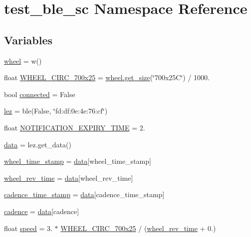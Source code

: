 \hypertarget{namespacetest__ble__sc}{}\section{test\+\_\+ble\+\_\+sc Namespace Reference}
\label{namespacetest__ble__sc}
\subsection*{Variables}
\begin{DoxyCompactItemize}
\item 
\hyperlink{namespacetest__ble__sc_a20264d27cfbcb7de858b1ca0e17e5e3b}{wheel} = w()
\item 
float \hyperlink{namespacetest__ble__sc_ab00679d6ecee9efe37b2803c4013de50}{W\+H\+E\+E\+L\+\_\+\+C\+I\+R\+C\+\_\+700x25} = \hyperlink{classwheel_1_1wheel_a2c8cb4fefde6714812f8d362b8744a63}{wheel.\+get\+\_\+size}(\char`\"{}700x25\+C\char`\"{}) / 1000.
\item 
bool \hyperlink{namespacetest__ble__sc_a93e07d8d1a8b72222e29c51ed19c31c6}{connected} = False
\item 
\hyperlink{namespacetest__ble__sc_a5821fe04e2db9045cfc972f8857dd3ed}{lez} = ble(False, \char`\"{}fd\+:df\+:0e\+:4e\+:76\+:cf\char`\"{})
\item 
float \hyperlink{namespacetest__ble__sc_a2ca65f5ebbcf2906c4f2c7f64eca7622}{N\+O\+T\+I\+F\+I\+C\+A\+T\+I\+O\+N\+\_\+\+E\+X\+P\+I\+R\+Y\+\_\+\+T\+I\+ME} = 2.
\item 
\hyperlink{namespacetest__ble__sc_a4c274ff1b1aa326a0c84020886e4e95e}{data} = lez.\+get\+\_\+data()
\item 
\hyperlink{namespacetest__ble__sc_ad4a89985d117b12a33ced724b7fe15d4}{wheel\+\_\+time\+\_\+stamp} = \hyperlink{namespacetest__ble__sc_a4c274ff1b1aa326a0c84020886e4e95e}{data}\mbox{[}\textquotesingle{}wheel\+\_\+time\+\_\+stamp\textquotesingle{}\mbox{]}
\item 
\hyperlink{namespacetest__ble__sc_a0a497b8848d062a75dcc5ea8160856c2}{wheel\+\_\+rev\+\_\+time} = \hyperlink{namespacetest__ble__sc_a4c274ff1b1aa326a0c84020886e4e95e}{data}\mbox{[}\textquotesingle{}wheel\+\_\+rev\+\_\+time\textquotesingle{}\mbox{]}
\item 
\hyperlink{namespacetest__ble__sc_a5e597b210eef53b415289d523ff66b9f}{cadence\+\_\+time\+\_\+stamp} = \hyperlink{namespacetest__ble__sc_a4c274ff1b1aa326a0c84020886e4e95e}{data}\mbox{[}\textquotesingle{}cadence\+\_\+time\+\_\+stamp\textquotesingle{}\mbox{]}
\item 
\hyperlink{namespacetest__ble__sc_a661e0e0f9f2dd021b389768753fde24a}{cadence} = \hyperlink{namespacetest__ble__sc_a4c274ff1b1aa326a0c84020886e4e95e}{data}\mbox{[}\textquotesingle{}cadence\textquotesingle{}\mbox{]}
\item 
float \hyperlink{namespacetest__ble__sc_ae88bb954b04e9b8192c753ea1fd34afc}{speed} = 3. $\ast$ \hyperlink{namespacetest__ble__sc_ab00679d6ecee9efe37b2803c4013de50}{W\+H\+E\+E\+L\+\_\+\+C\+I\+R\+C\+\_\+700x25} / (\hyperlink{namespacetest__ble__sc_a0a497b8848d062a75dcc5ea8160856c2}{wheel\+\_\+rev\+\_\+time} + 0.)
\end{DoxyCompactItemize}


